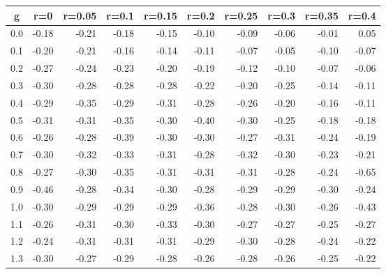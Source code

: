 %
\begin{table}[!tbp]
 \begin{center}
 \begin{tabular}{rrrrrrrrrr}\hline\hline
\multicolumn{1}{c}{g}&\multicolumn{1}{c}{r=0}&\multicolumn{1}{c}{r=0.05}&\multicolumn{1}{c}{r=0.1}&\multicolumn{1}{c}{r=0.15}&\multicolumn{1}{c}{r=0.2}&\multicolumn{1}{c}{r=0.25}&\multicolumn{1}{c}{r=0.3}&\multicolumn{1}{c}{r=0.35}&\multicolumn{1}{c}{r=0.4}\tabularnewline
\hline
0.0&-0.18&-0.21&-0.18&-0.15&-0.10&-0.09&-0.06&-0.01& 0.05\tabularnewline
0.1&-0.20&-0.21&-0.16&-0.14&-0.11&-0.07&-0.05&-0.10&-0.07\tabularnewline
0.2&-0.27&-0.24&-0.23&-0.20&-0.19&-0.12&-0.10&-0.07&-0.06\tabularnewline
0.3&-0.30&-0.28&-0.28&-0.28&-0.22&-0.20&-0.25&-0.14&-0.11\tabularnewline
0.4&-0.29&-0.35&-0.29&-0.31&-0.28&-0.26&-0.20&-0.16&-0.11\tabularnewline
0.5&-0.31&-0.31&-0.35&-0.30&-0.40&-0.30&-0.25&-0.18&-0.18\tabularnewline
0.6&-0.26&-0.28&-0.39&-0.30&-0.30&-0.27&-0.31&-0.24&-0.19\tabularnewline
0.7&-0.30&-0.32&-0.33&-0.31&-0.28&-0.32&-0.30&-0.23&-0.21\tabularnewline
0.8&-0.27&-0.30&-0.35&-0.31&-0.31&-0.31&-0.28&-0.24&-0.65\tabularnewline
0.9&-0.46&-0.28&-0.34&-0.30&-0.28&-0.29&-0.29&-0.30&-0.24\tabularnewline
1.0&-0.30&-0.29&-0.29&-0.29&-0.36&-0.28&-0.30&-0.26&-0.43\tabularnewline
1.1&-0.26&-0.31&-0.30&-0.33&-0.30&-0.27&-0.27&-0.25&-0.27\tabularnewline
1.2&-0.24&-0.31&-0.31&-0.31&-0.29&-0.30&-0.28&-0.24&-0.22\tabularnewline
1.3&-0.30&-0.27&-0.29&-0.28&-0.26&-0.28&-0.26&-0.25&-0.22\tabularnewline
\hline
\end{tabular}

\end{center}

\end{table}

